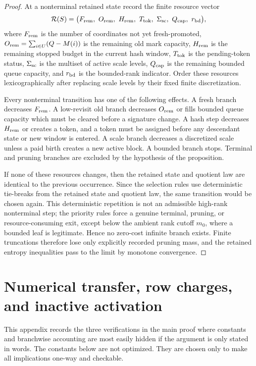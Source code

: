 \documentclass[11pt]{article}
\theoremstyle{remark}
\begin{document}
\begin{proof}
At a nonterminal retained state record the finite resource vector
\[
\mathcal R(S)=\bigl(F_{\rm rem},\ O_{\rm rem},\ H_{\rm rem},\ T_{\rm tok},\ \Sigma_{\rm sc},\ Q_{\rm cap},\ r_{\rm bd}\bigr),
\]
where $F_{\rm rem}$ is the number of coordinates not yet fresh-promoted, $O_{\rm rem}=\sum_{i\in U}(Q-M(i))$ is the remaining old mark capacity, $H_{\rm rem}$ is the remaining stopped budget in the current hash window, $T_{\rm tok}$ is the pending-token status, $\Sigma_{\rm sc}$ is the multiset of active scale levels, $Q_{\rm cap}$ is the remaining bounded queue capacity, and $r_{\rm bd}$ is the bounded-rank indicator.  Order these resources lexicographically after replacing scale levels by their fixed finite discretization.

Every nonterminal transition has one of the following effects.  A fresh branch decreases $F_{\rm rem}$.  A low-revisit old branch decreases $O_{\rm rem}$ or fills bounded queue capacity which must be cleared before a signature change.  A hash step decreases $H_{\rm rem}$ or creates a token, and a token must be assigned before any descendant state or new window is entered.  A scale branch decreases a discretized scale unless a paid birth creates a new active block.  A bounded branch stops.  Terminal and pruning branches are excluded by the hypothesis of the proposition.

If none of these resources changes, then the retained state and quotient law are identical to the previous occurrence.  Since the selection rules use deterministic tie-breaks from the retained state and quotient law, the same transition would be chosen again.  This deterministic repetition is not an admissible high-rank nonterminal step; the priority rules force a genuine terminal, pruning, or resource-consuming exit, except below the ambient rank cutoff $m_0$, where a bounded leaf is legitimate.  Hence no zero-cost infinite branch exists.  Finite truncations therefore lose only explicitly recorded pruning mass, and the retained entropy inequalities pass to the limit by monotone convergence.
\end{proof}



\section{Numerical transfer, row charges, and inactive activation}\label{app:numerical-details}

This appendix records the three verifications in the main proof where constants and branchwise accounting are most easily hidden if the argument is only stated in words.  The constants below are not optimized.  They are chosen only to make all implications one-way and checkable.
\end{document}
